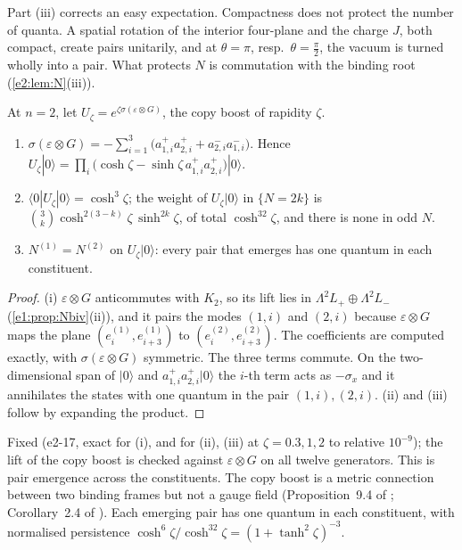 Part (iii) corrects an easy expectation. Compactness does not protect the number of quanta. A spatial rotation of the interior four-plane
and the charge $J$, both compact, create pairs unitarily, and at $\theta=\pi$, resp.\ $\theta=\tfrac\pi2$, the vacuum is turned wholly into a pair.
What protects $N$ is commutation with the binding root (\cref{e2:lem:N}(iii)).

\begin{proposition}
\label{e2:prop:copyboost}
At $n=2$, let $U_\zeta=e^{\zeta\sigma(\varepsilon\otimes G)}$, the copy boost of rapidity $\zeta$.
\begin{enumerate}[label=(\roman*),leftmargin=2.2em]
\item $\sigma(\varepsilon\otimes G)=-\sum_{i=1}^3\bigl(a^+_{1,i}a^+_{2,i}+a^-_{2,i}a^-_{1,i}\bigr)$. Hence
$U_\zeta|0\rangle=\prod_i\bigl(\cosh\zeta-\sinh\zeta\,a^+_{1,i}a^+_{2,i}\bigr)|0\rangle$.
\item $\langle0|U_\zeta|0\rangle=\cosh^3\zeta$; the weight of $U_\zeta|0\rangle$ in $\{N=2k\}$ is $\binom3k\cosh^{2(3-k)}\zeta\,\sinh^{2k}\zeta$, of total $\cosh^32\zeta$, and
there is none in odd $N$.
\item $N^{(1)}=N^{(2)}$ on $U_\zeta|0\rangle$: every pair that emerges has one quantum in each constituent.
\end{enumerate}
\end{proposition}

\begin{proof}
(i) $\varepsilon\otimes G$ anticommutes with $K_2$, so its lift lies in $\Lambda^2L_+\oplus\Lambda^2L_-$ (\cref{e1:prop:Nbiv}(ii)), and it pairs the modes
$(1,i)$ and $(2,i)$ because $\varepsilon\otimes G$ maps the plane $(e^{(1)}_i,e^{(1)}_{i+3})$ to $(e^{(2)}_i,e^{(2)}_{i+3})$. The coefficients are
computed exactly, with $\sigma(\varepsilon\otimes G)$ symmetric. The three terms commute. On the two-dimensional span of $|0\rangle$ and
$a^+_{1,i}a^+_{2,i}|0\rangle$ the $i$-th term acts as $-\sigma_x$ and it annihilates the states with one quantum in the pair $(1,i),(2,i)$. (ii)
and (iii) follow by expanding the product.
\end{proof}

Fixed (e2-17, exact for (i), and for (ii), (iii) at $\zeta=0.3,1,2$ to relative $10^{-9}$); the lift of the copy boost is checked against
$\varepsilon\otimes G$ on all twelve generators. This is pair emergence across the constituents. The copy boost is a metric connection
between two binding frames but not a gauge field (Proposition~9.4 of \cite{RE}; Corollary~2.4 of \cite{ES17}). Each emerging pair has
one quantum in each constituent, with normalised persistence $\cosh^6\zeta/\cosh^32\zeta=(1+\tanh^2\zeta)^{-3}$.

